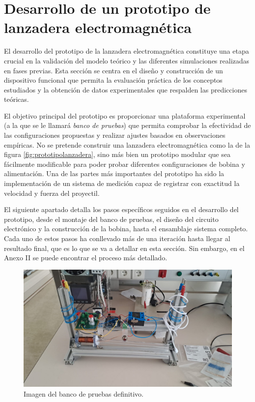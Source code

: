 \section{Desarrollo de un prototipo de lanzadera electromagnética}
\label{sec:prototipo}

El desarrollo del prototipo de la lanzadera electromagnética constituye una etapa crucial en la validación del modelo teórico y las diferentes simulaciones realizadas en fases previas. Esta sección se centra en el diseño y construcción de un dispositivo funcional que permita la evaluación práctica de los conceptos estudiados y la obtención de datos experimentales que respalden las predicciones teóricas.

El objetivo principal del prototipo es proporcionar una plataforma experimental (a la que se le llamará \textit{banco de pruebas}) que permita comprobar la efectividad de las configuraciones propuestas y realizar ajustes basados en observaciones empíricas. No se pretende construir una lanzadera electromagnética como la de la figura \ref{fig:prototipolanzadera}, sino más bien un prototipo modular que sea fácilmente modificable para poder probar diferentes configuraciones de bobina y alimentación. Una de las partes más importantes del prototipo ha sido la implementación de un sistema de medición capaz de registrar con exactitud la velocidad y fuerza del proyectil.

El siguiente apartado detalla los pasos específicos seguidos en el desarrollo del prototipo, desde el montaje del banco de pruebas, el diseño del circuito electrónico y la construcción de la bobina, hasta el ensamblaje sistema completo. Cada uno de estos pasos ha conllevado más de una iteración hasta llegar al resultado final, que es lo que se va a detallar en esta sección. Sin embargo, en el Anexo II se puede encontrar el proceso más detallado.

\begin{figure}[H]
    \centering
    \includegraphics[width=\textwidth]{FigurasMemoria/prototipoFinal.jpeg}
    \caption{Imagen del banco de pruebas definitivo.}
    \label{fig:prototipoFinal} %
\end{figure}

